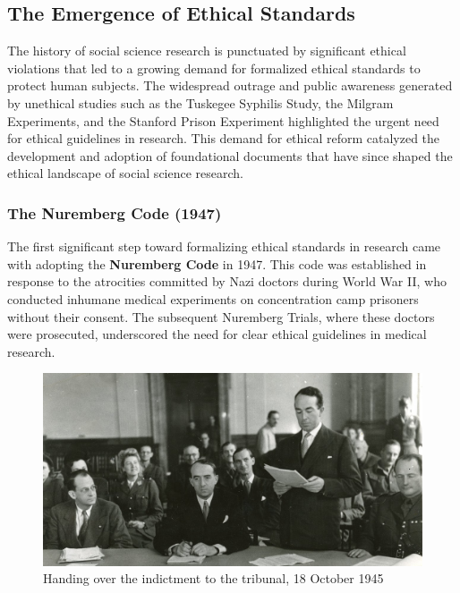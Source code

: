 \documentclass[
]{book}
\begin{document}
\subsection*{The Emergence of Ethical Standards}\label{the-emergence-of-ethical-standards}

The history of social science research is punctuated by significant ethical violations that led to a growing demand for formalized ethical standards to protect human subjects. The widespread outrage and public awareness generated by unethical studies such as the Tuskegee Syphilis Study, the Milgram Experiments, and the Stanford Prison Experiment highlighted the urgent need for ethical guidelines in research. This demand for ethical reform catalyzed the development and adoption of foundational documents that have since shaped the ethical landscape of social science research.

\subsubsection*{The Nuremberg Code (1947)}\label{the-nuremberg-code-1947}

The first significant step toward formalizing ethical standards in research came with adopting the \textbf{Nuremberg Code} in 1947. This code was established in response to the atrocities committed by Nazi doctors during World War II, who conducted inhumane medical experiments on concentration camp prisoners without their consent. The subsequent Nuremberg Trials, where these doctors were prosecuted, underscored the need for clear ethical guidelines in medical research.

\begin{figure}
\centering
\includegraphics[width=1\linewidth,height=\textheight,keepaspectratio]{images/nuremberg-trial.jpg}
\caption{Handing over the indictment to the tribunal, 18 October 1945}
\end{figure}
\end{document}
